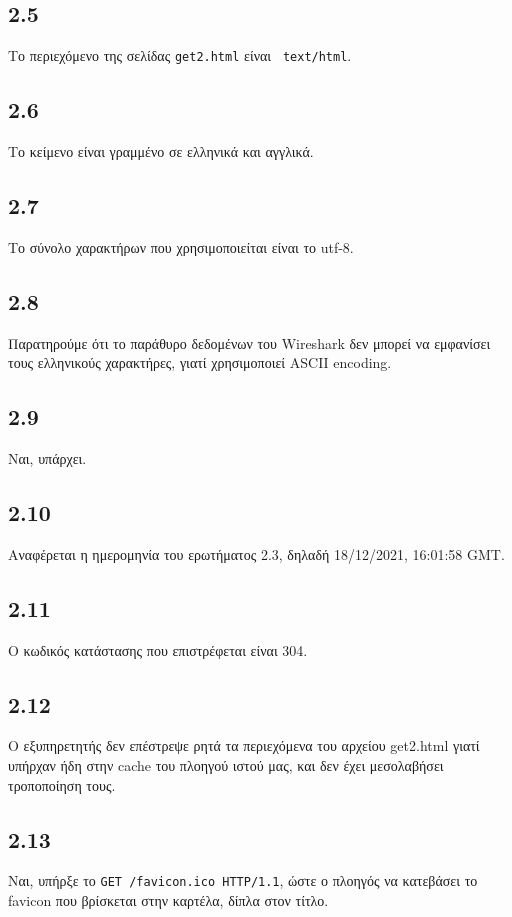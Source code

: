 		\subsection*{2.5}
			Το περιεχόμενο της σελίδας \verb|get2.html| είναι \verb| text/html|.
	
		\subsection*{2.6}
			Το κείμενο είναι γραμμένο σε ελληνικά και αγγλικά.
	
		\subsection*{2.7}
			Το σύνολο χαρακτήρων που χρησιμοποιείται είναι το utf-8.
	
		\subsection*{2.8}
			Παρατηρούμε ότι το παράθυρο δεδομένων του Wireshark δεν μπορεί να εμφανίσει τους ελληνικούς χαρακτήρες, γιατί χρησιμοποιεί ASCII encoding. 
	
		\subsection*{2.9}
			Ναι, υπάρχει.
	
		\subsection*{2.10}
			Αναφέρεται η ημερομηνία του ερωτήματος 2.3, δηλαδή 18/12/2021, 16:01:58 GMT.
	
		\subsection*{2.11}
			Ο κωδικός κατάστασης που επιστρέφεται είναι 304.
	
		\subsection*{2.12}
			Ο εξυπηρετητής δεν επέστρεψε ρητά τα περιεχόμενα του αρχείου get2.html γιατί υπήρχαν ήδη στην cache του πλοηγού ιστού μας, και δεν έχει μεσολαβήσει τροποποίηση τους.
	
		\subsection*{2.13}
			Ναι, υπήρξε το \verb|GET /favicon.ico HTTP/1.1|, ώστε ο πλοηγός να κατεβάσει το favicon που βρίσκεται στην καρτέλα, δίπλα στον τίτλο. 
	

